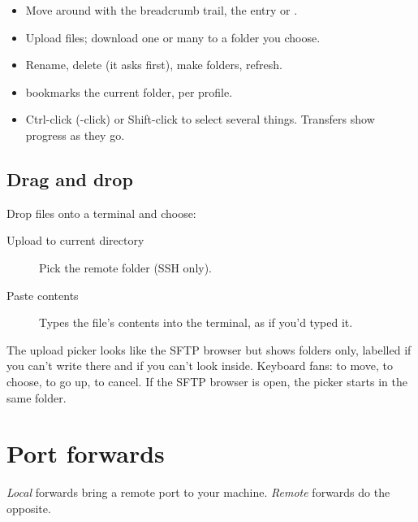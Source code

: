 
\begin{itemize}
  \item Move around with the breadcrumb trail, the  entry or .
  \item Upload files; download one or many to a folder you choose.
  \item Rename, delete (it asks first), make folders, refresh.
  \item \iStar{} bookmarks the current folder, per profile.
  \item Ctrl-click (-click) or Shift-click to select several things. Transfers show progress as they go.
\end{itemize}

\section{Drag and drop}

Drop files onto a terminal and choose:

\begin{description}
  \item[Upload to current directory] Pick the remote folder (SSH only).
  \item[Paste contents] Types the file's contents into the terminal, as if you'd typed it.
\end{description}

The upload picker looks like the SFTP browser but shows folders only, labelled  if you can't
write there and  if you can't look inside. Keyboard fans:  to move,  to
choose,  to go up,  to cancel. If the SFTP browser is open, the picker starts in the same folder.


\chapter{Port forwards}\label{ch:forwards}

\begin{tldr}
\emph{Local} forwards bring a remote port to your machine. \emph{Remote} forwards do the opposite.
\end{tldr}

